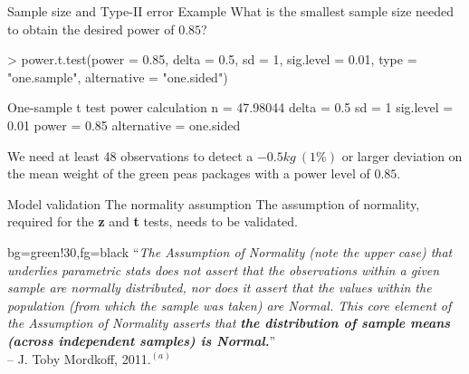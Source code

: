 \documentclass[t]{beamer}
\begin{document}
\begin{ftstf}
{Sample size and Type-II error}
{Example}
What is the smallest sample size needed to obtain the desired power of $0.85$?
\vhalf
\begin{rcode}
> power.t.test(power = 0.85, delta = 0.5, sd = 1, sig.level = 0.01,
               type = "one.sample", alternative = "one.sided")

One-sample t test power calculation 
n = 47.98044
delta = 0.5
sd = 1
sig.level = 0.01
power = 0.85
alternative = one.sided
\end{rcode}
\vhalf
We need at least 48 observations to detect a $-0.5kg\ (1\%)$ or larger deviation on the mean weight of the green peas packages with a power level of $0.85$.
\end{ftstf}

\begin{ftst}
{Model validation}
{The normality assumption}
The assumption of normality, required for the \textbf{z} and \textbf{t} tests, needs to be validated.
	\begin{colorblock}{}{bg=green!30,fg=black}
	``\textit{The Assumption of Normality (note the upper case) that underlies parametric stats does not assert that the observations within a given sample are normally distributed, nor does it assert that the values within the population (from which the sample was taken) are Normal. This core element of the Assumption of Normality asserts that \textbf{the distribution of sample means (across independent samples) is Normal.}}''\\
	\flushright -- J. Toby Mordkoff, 2011.$^{(a)}$
	\end{colorblock}

\end{ftst}
\end{document}
